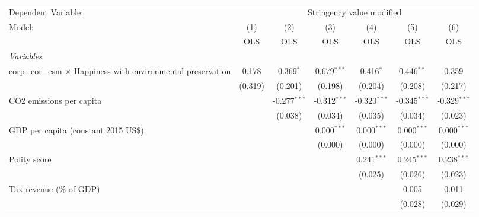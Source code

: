 
\begingroup
\centering
\begin{tabular}{lcccccc}
   \toprule
   Dependent Variable: & \multicolumn{6}{c}{Stringency value modified}\\
   Model:                                                               & (1)     & (2)            & (3)            & (4)            & (5)            & (6)\\  
                                                                        &  OLS    & OLS            & OLS            & OLS            & OLS            & OLS\\  
   \midrule
   \emph{Variables}\\
   corp\_cor\_esm $\times$ Happiness with environmental preservation    & 0.178   & 0.369$^{*}$    & 0.679$^{***}$  & 0.416$^{*}$    & 0.446$^{**}$   & 0.359\\   
                                                                        & (0.319) & (0.201)        & (0.198)        & (0.204)        & (0.208)        & (0.217)\\   
   CO2 emissions per capita                                             &         & -0.277$^{***}$ & -0.312$^{***}$ & -0.320$^{***}$ & -0.345$^{***}$ & -0.329$^{***}$\\   
                                                                        &         & (0.038)        & (0.034)        & (0.035)        & (0.034)        & (0.023)\\   
   GDP per capita (constant 2015 US\$)                                  &         &                & 0.000$^{***}$  & 0.000$^{***}$  & 0.000$^{***}$  & 0.000$^{***}$\\   
                                                                        &         &                & (0.000)        & (0.000)        & (0.000)        & (0.000)\\   
   Polity score                                                         &         &                &                & 0.241$^{***}$  & 0.245$^{***}$  & 0.238$^{***}$\\   
                                                                        &         &                &                & (0.025)        & (0.026)        & (0.023)\\   
   Tax revenue (\% of GDP)                                              &         &                &                &                & 0.005          & 0.011\\   
                                                                        &         &                &                &                & (0.028)        & (0.029)\\   

\end{tabular}
